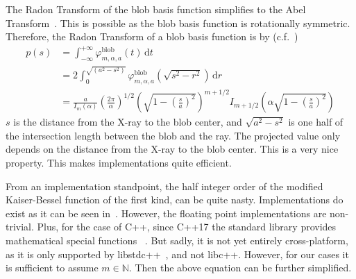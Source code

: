 The Radon Transform  of the blob basis function simplifies to the Abel
Transform~\cite{buzug_computed_2008}. This is possible as the blob basis function is rotationally
symmetric. Therefore, the Radon Transform of a blob basis function is by
(c.f.~\cite{lewitt_multidimensional_1990,lewitt_alternatives_1992})
\begin{align}\label{eq:radon_blob_basis}
	p(s) & = \int_{-\infty}^{+\infty} \varphi^{\text{blob}}_{m, \alpha, a}\left(t\right) \, \mathrm{d} t                                                                                                       \\
	     & = 2 \int_0^{\sqrt{(a^2-s^2)}} \varphi^{\text{blob}}_{m, \alpha, a}\left(\sqrt{s^2 - r^2}\right) \, \mathrm{d} r                                                                                     \\
	     & = \frac{a}{I_m(\alpha)} \left( \frac{2\pi}{\alpha}\right)^{1/2} \left( \sqrt{1 - \left(\frac{s}{a}\right)^2} \right)^{m + 1/2} I_{m+1/2}\left( \alpha \sqrt{1 - \left(\frac{s}{a}\right)^2} \right)
\end{align}
\(s\) is the distance from the X-ray to the blob center, and \(\sqrt{a^2 - s^2}\) is one half of the
intersection length between the blob and the ray. The projected value only depends on the distance
from the X-ray to the blob center. This is a very nice property. This makes implementations quite
efficient.


From an implementation standpoint, the half integer order of the modified Kaiser-Bessel function
of the first kind, can be quite nasty. Implementations do exist as it can be seen
in~\cite{temme_numerical_1975}. However, the floating point implementations are non-trivial. Plus,
for the case of C++, since C++17 the standard library provides mathematical special functions
~\cite{noauthor_c_nodate, noauthor_stdcyl_bessel_i_nodate}. But sadly, it is not yet entirely
cross-platform, as it is only supported by libstdc++~\cite{noauthor_libstdc_nodate-1}, and not
libc++. However, for our cases it is sufficient to assume \(m \in \mathbb{N}\). Then the above
equation can be further simplified.

